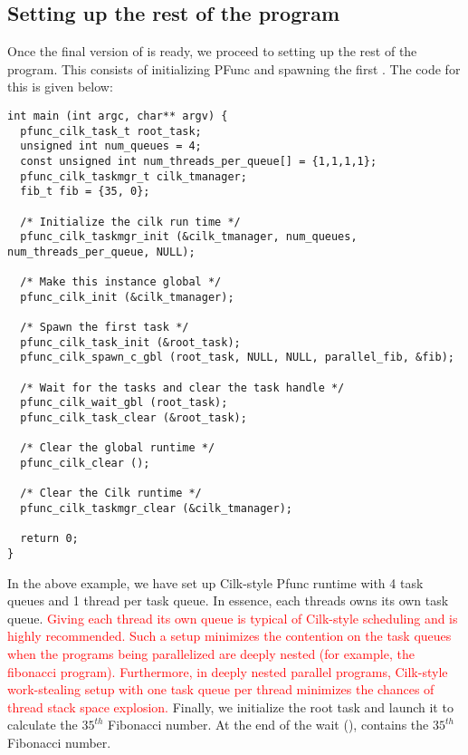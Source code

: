 \subsection{Setting up the rest of the program}
\label{subsec:fib_main}

Once the final version of  is ready, we proceed to setting
up the rest of the program. This consists of initializing PFunc and spawning 
the first . The code for this is given below:

\begin{lstlisting}
int main (int argc, char** argv) {
  pfunc_cilk_task_t root_task;
  unsigned int num_queues = 4;
  const unsigned int num_threads_per_queue[] = {1,1,1,1};
  pfunc_cilk_taskmgr_t cilk_tmanager;
  fib_t fib = {35, 0};

  /* Initialize the cilk run time */
  pfunc_cilk_taskmgr_init (&cilk_tmanager, num_queues, num_threads_per_queue, NULL);

  /* Make this instance global */
  pfunc_cilk_init (&cilk_tmanager);

  /* Spawn the first task */
  pfunc_cilk_task_init (&root_task);
  pfunc_cilk_spawn_c_gbl (root_task, NULL, NULL, parallel_fib, &fib);

  /* Wait for the tasks and clear the task handle */
  pfunc_cilk_wait_gbl (root_task);
  pfunc_cilk_task_clear (&root_task);

  /* Clear the global runtime */
  pfunc_cilk_clear ();

  /* Clear the Cilk runtime */
  pfunc_cilk_taskmgr_clear (&cilk_tmanager);

  return 0;
}
\end{lstlisting}

In the above example, we have set up Cilk-style Pfunc runtime with 4 task 
queues and 1 thread per task queue. In essence, each threads owns its own 
task queue. \textcolor{red}{Giving each thread its own queue is typical of 
Cilk-style scheduling and is highly recommended. Such a setup minimizes the 
contention on the task queues when the programs being parallelized are deeply
nested (for example, the fibonacci program). Furthermore, in deeply nested 
parallel programs, Cilk-style work-stealing setup with one task queue per thread
minimizes the chances of thread stack space explosion.} Finally, we initialize
the root task and launch it to calculate the $35^{th}$ Fibonacci number. At the
end of the wait (),  contains the
$35^{th}$ Fibonacci number.

